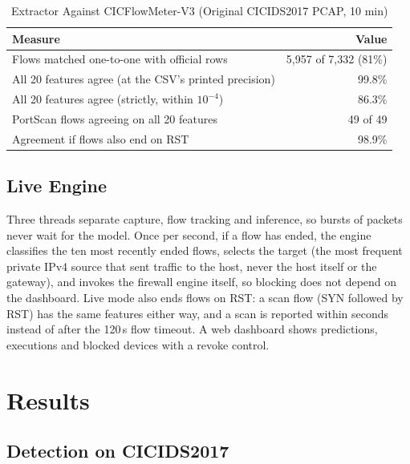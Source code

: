 \documentclass[conference]{IEEEtran}
\begin{document}
\begin{table}[htbp]
\caption{Extractor Against CICFlowMeter-V3 (Original CICIDS2017 PCAP, 10 min)}
\begin{center}
\footnotesize
\begin{tabularx}{\columnwidth}{|Y|r|}
\hline
\textbf{Measure} & \textbf{Value}\\
\hline
Flows matched one-to-one with official rows        & 5{,}957 of 7{,}332 (81\%)\\
\hline
All 20 features agree (at the CSV's printed precision) & 99.8\%\\
\hline
All 20 features agree (strictly, within $10^{-4}$) & 86.3\%\\
\hline
PortScan flows agreeing on all 20 features         & 49 of 49\\
\hline
Agreement if flows also end on RST                 & 98.9\%\\
\hline
\end{tabularx}
\label{tab:extractor}
\end{center}
\end{table}

\subsection{Live Engine}
Three threads separate capture, flow tracking and inference, so bursts of
packets never wait for the model. Once per second, if a flow has ended, the
engine classifies the ten most recently ended flows, selects the target (the
most frequent private IPv4 source that sent traffic to the host, never the
host itself or the gateway), and invokes the firewall engine itself, so
blocking does not depend on the dashboard. Live mode also ends flows on RST:
a scan flow (SYN followed by RST) has the same features either way, and a
scan is reported within seconds instead of after the 120\,s flow timeout. A
web dashboard shows predictions, executions and blocked devices with a revoke
control.

\section{Results}
\label{sec:results}

\subsection{Detection on CICIDS2017}
\end{document}
